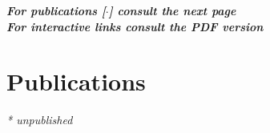 \documentclass[letterpaper]{twentysecondcv} %
\begin{document}
\begin{flushright}
\textbf{\textit{For publications [$\cdot$] consult the next page}}
\\
\textbf{\textit{For interactive links consult the PDF version}}
\end{flushright}









\newpage







\section{Publications}

\nocite{*}

\printbibliography[heading=none,title={}]

\begin{flushright}
\textit{* unpublished}
\end{flushright}
\end{document}
